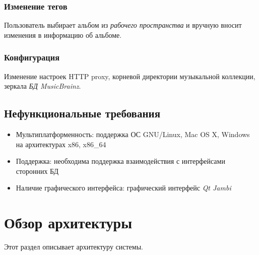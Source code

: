 \documentclass[pdftex,12pt,a4paper]{report}
\providecommand{\comment}[1]{\textcolor{blue}{#1}}
\begin{document}
\subsubsection{Изменение тегов}
Пользователь выбирает альбом из {\it рабочего пространства} и вручную вносит изменения в информацию об альбоме.

\subsubsection{Конфигурация}
Изменение настроек HTTP proxy, корневой директории музыкальной коллекции, зеркала {\it БД MusicBrainz}.

\subsection{Нефункциональные требования}
\begin{itemize}
	\item Мультиплатформенность: поддержка ОС GNU/Linux, Mac OS X, Windows на архитектурах x86, x86\_64
	\item Поддержка: необходима поддержка взаимодействия с интерфейсами сторонних БД
	\item Наличие графического интерфейса: графический интерфейс {\it Qt Jambi}
\end{itemize}

\section{Обзор архитектуры}
Этот раздел описывает архитектуру системы.

\setcounter{subsection}{1}

\end{document}
